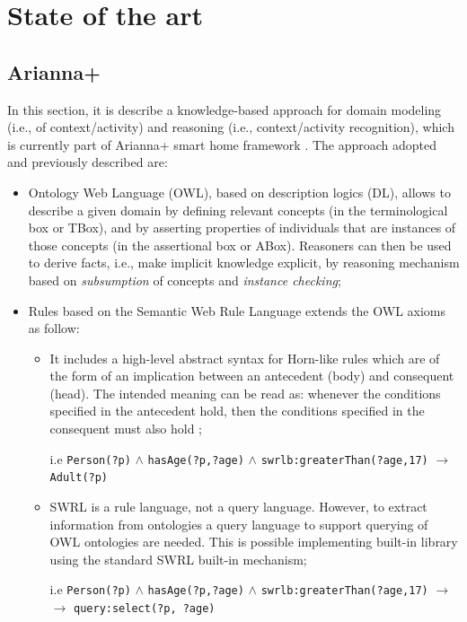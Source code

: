 \documentclass{thesisreport}
\begin{document}
 \chapter{State of the art}
 
 \section{Arianna+} \label{Arianna}     
 In this section, it is describe a knowledge-based approach for domain modeling (i.e., of context/activity) and reasoning (i.e., context/activity recognition), which is currently part of Arianna+ smart home framework \cite{kareem2018arianna}.
 The approach adopted and previously described are: 
 \begin{itemize}
     \item Ontology Web Language (OWL), based on description logics (DL), allows to describe a given domain by defining relevant concepts (in the terminological box or TBox), and by asserting properties of individuals that are instances of those concepts (in the assertional box or ABox).
     Reasoners can then be used to derive facts, i.e., make implicit knowledge explicit, by reasoning mechanism \cite{donini1994deduction} based on \textit{subsumption} of concepts and \textit{instance checking};
     \item Rules based on the Semantic Web Rule Language extends the OWL axioms as follow:
    \begin{itemize}
        \item It includes a high-level abstract syntax for Horn-like rules which are of the form of an implication between an antecedent (body) and consequent (head). The intended meaning can be read as: whenever the conditions specified in the antecedent hold, then the conditions specified in the consequent must also hold \cite{horrocks2004swrl};
        
        i.e \texttt{Person(?p)} $\wedge$ \texttt{hasAge(?p,?age)} $\wedge$ \texttt{swrlb:greaterThan(?age,17)} $\rightarrow$ \texttt{Adult(?p)}
        
        \item SWRL is a rule language, not a query language. However, to extract information from ontologies a query language to support querying of OWL ontologies are needed.
        This is possible implementing  built-in library using the standard SWRL built-in mechanism; 
        
         i.e \texttt{Person(?p)} $\wedge$ \texttt{hasAge(?p,?age)} $\wedge$ \texttt{swrlb:greaterThan(?age,17)} $\rightarrow$ \\  $\rightarrow$ \texttt{query:select(?p, ?age)}
        
    \end{itemize}
 \end{itemize}
 
\end{document}

